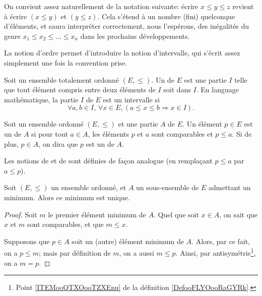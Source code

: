 \begin{normaltext}\label{NORMooIntroIntervalleOrdonne}
	On convient assez naturellement de la notation suivante: écrire \( x \leq y \leq z \) revient à écrire \( (x \leq y)\text{ et } (y \leq z) \). Cela s'étend à un nombre (fini) quelconque d'éléments, et  saura interpréter correctement, nous l'espérons, des inégalités du genre \( x_1 \leq x_2 \leq \dots \leq x_n \) dans les prochains développements.

	La notion d'ordre permet d'introduire la notion d'intervalle, qui s'écrit assez simplement une fois la convention prise.
\end{normaltext}

\begin{definition}  \label{DefEYAooMYYTz}
	Soit un ensemble totalement ordonné \( (E,\leq)\). Un  de \( E\) est une partie \( I\) telle que tout élément compris entre deux éléments de \( I \) soit dans \( I \). En language mathématique, la partie \( I \) de \( E\) est un intervalle si
	\[
		\forall a,b\in I,\, \forall x \in E, (a\leq x\leq b \Rightarrow x\in I).
	\]
\end{definition}

\begin{definition}      \label{DEFooDNWRooTiMAzK}
	Soit un ensemble ordonné \( (E,\leq)\) et une partie \( A\) de \( E\). Un élément \( p\in E\) est un  de \( A\) si pour tout \( a\in A\), les éléments \( p\) et \( a\) sont comparables et \( p\leq a\). Si de plus, \( p \in A \), on dira que \( p \) est un  de \( A\).

	Les notions de  et de  sont définies de façon analogue (en remplaçant \( p\leq a\) par \( a\leq p\)).
\end{definition}

\begin{proposition}\label{PROPooUniciteMinMax}
	Soit \( (E, \leq) \) un ensemble ordonné, et \( A \) un sous-ensemble de \( E \) admettant un minimum. Alors ce minimum est unique.
\end{proposition}

\begin{proof}
	Soit \( m \) le premier élément minimum de \( A \). Quel que soit \(x \in A \), on sait que \( x \) et \( m \) sont comparables, et que \( m \leq x \).

	Supposons que \( p \in A \) soit un (autre) élément minimum de \( A \). Alors, par ce fait, on a \( p \leq m \); mais par définition de \( m \), on a aussi \( m \leq p \). Ainsi, par antisymétrie\footnote{Point \ref{ITEMooQTXOooTZXEnu} de la définition \ref{DefooFLYOooRaGYRk}.}, on a \( m = p\).
\end{proof}

